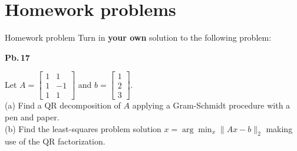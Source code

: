 \documentclass[t,usepdftitle=false]{beamer}
\begin{document}
\section{Homework problems}
\begin{frame}{Homework problem}\vspace{.1cm}
Turn in \textbf{your own} solution to the following problem:\vspace{.15cm}\\
\begin{minipage}[t]{0.1\textwidth}
\textbf{Pb.$\,$17}
\end{minipage}
\begin{minipage}[t]{0.89\textwidth}
Let $A=\begin{bmatrix}1&1\\1&-1\\1&1\end{bmatrix}$ and $b=\begin{bmatrix}1\\2\\3\end{bmatrix}$.\vspace{.4cm}\\
(a) Find a QR decomposition of $A$ applying a Gram-Schmidt procedure with a pen and paper.\vspace{.1cm}\\
(b) Find the least-squares problem solution $x=\arg\min_x\|Ax-b\|_2$ making use of the QR factorization.
\end{minipage}\vspace{.15cm}
\end{frame}
\end{document}
